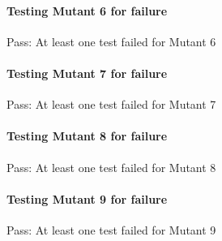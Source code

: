 \paragraph*{Testing Mutant 6 for failure}


\begin{DoxyItemize}
\item Pass\+: At least one test failed for Mutant 6
\end{DoxyItemize}

\paragraph*{Testing Mutant 7 for failure}


\begin{DoxyItemize}
\item Pass\+: At least one test failed for Mutant 7
\end{DoxyItemize}

\paragraph*{Testing Mutant 8 for failure}


\begin{DoxyItemize}
\item Pass\+: At least one test failed for Mutant 8
\end{DoxyItemize}

\paragraph*{Testing Mutant 9 for failure}


\begin{DoxyItemize}
\item Pass\+: At least one test failed for Mutant 9 
\end{DoxyItemize}